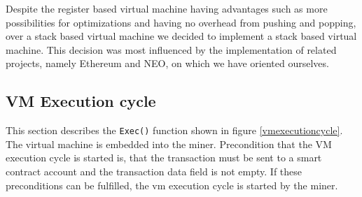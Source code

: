 
Despite the register based virtual machine having advantages such as more possibilities for optimizations and having no overhead from pushing and popping, over a stack based virtual machine we decided to implement a stack based virtual machine. This decision was most influenced by the implementation of related projects, namely Ethereum and NEO, on which we have oriented ourselves.

\subsection{VM Execution cycle}
This section describes the \texttt{Exec()} function shown in figure \ref{vmexecutioncycle}.
The virtual machine is embedded into the miner. Precondition that the VM execution cycle is started is, that the transaction must be sent to a smart contract account and the transaction data field is not empty. If these preconditions can be fulfilled, the vm execution cycle is started by the miner.

